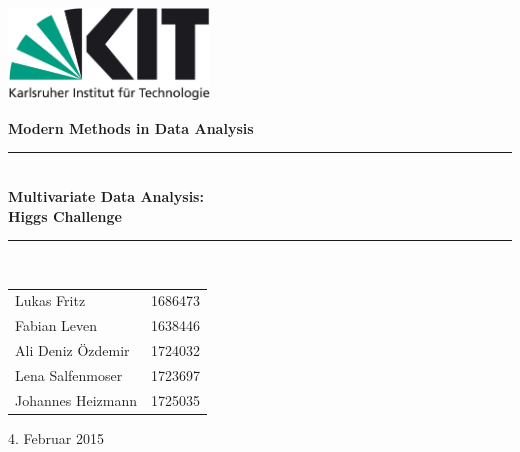 \documentclass[11pt,a4paper]{scrartcl}
\newcommand{\Versuchsname}{Multivariate Data Analysis: \\ Higgs Challenge}			%
\newcommand{\Datum}{4. Februar 2015}			%
\begin{document}
\newcommand{\bra}[1]{\ensuremath{\left( #1 \right)}}
\newcommand{\abs}[1]{\ensuremath{\left| #1 \right|}}
\newcommand{\diff}[2]{\ensuremath{\frac{\partial #1}{\partial #2}}}

\newcommand{\HRule}{\rule{\linewidth}{0.5mm}}
\newcommand{\E}[1]{\textrm{#1}}
\begin{titlepage}
	\begin{flushright}
		\includegraphics[width=0.4\textwidth]{kit_logo_de_farbe_positiv.jpg}\\[1cm]
	\end{flushright}
	\vspace{2cm}
	\begin{center}
	{\huge \textbf{Modern Methods in Data Analysis}}
	\vspace{1cm}

\HRule \\[0.4cm]
{ \huge \bfseries \Versuchsname}\\[0.2cm]
\HRule \\[0.5cm]

\begin{flushleft}
	\begin{minipage}{0.4\textwidth}
	\large
		\begin{tabular}{l l}
			Lukas Fritz & 1686473 \\
			Fabian Leven & 1638446\\
			Ali Deniz Özdemir & 1724032\\
			Lena Salfenmoser & 1723697\\
			Johannes Heizmann & 1725035 \\
		\end{tabular}
	\end{minipage}
\end{flushleft}
\vfill

{\large \Datum}
\end{center}

\end{titlepage}
\tableofcontents
\newpage











%
%
%
\end{document}
